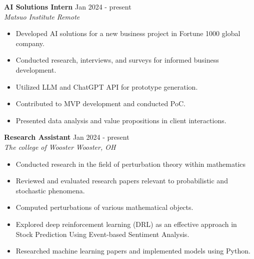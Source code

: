 \documentclass[a4paper,12pt]{article}
\begin{document}
\textbf{\large AI Solutions Intern} \hfill \textnormal{Jan 2024 - present}\\
\textit{Matsuo Institute} \hfill \textit{Remote}
\begin{itemize}
    \item Developed AI solutions for a new business project in Fortune 1000 global company.
    \item Conducted research, interviews, and surveys for informed business development.
    \item Utilized LLM and ChatGPT API for prototype generation.
    \item Contributed to MVP development and conducted PoC.
    \item Presented data analysis and value propositions in client interactions.
\end{itemize}
\textbf{\large Research Assistant} \hfill \textnormal{Jan 2024 - present}\\
\textit{The college of Wooster} \hfill \textit{Wooster, OH}
\begin{itemize}
    \item Conducted research in the field of perturbation theory within mathematics
    \item Reviewed and evaluated research papers relevant to probabilistic and stochastic phenomena.
    \item Computed perturbations of various mathematical objects.
    \item Explored deep reinforcement learning (DRL) as an effective approach in Stock Prediction Using Event-based Sentiment Analysis.
    \item Researched machine learning papers and implemented models using Python.
\end{itemize}
\end{document}
